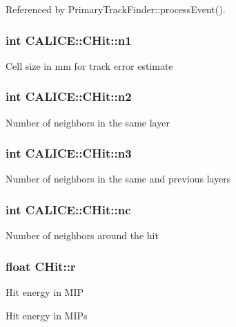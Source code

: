 Referenced by Primary\-Track\-Finder\-::process\-Event().

\subsubsection[{n1}]{\setlength{\rightskip}{0pt plus 5cm}int C\-A\-L\-I\-C\-E\-::\-C\-Hit\-::n1}\label{classCALICE_1_1CHit_ac76e3d9bbfa459b7a49cd30cc09639d3}
Cell size in mm for track error estimate 
\subsubsection[{n2}]{\setlength{\rightskip}{0pt plus 5cm}int C\-A\-L\-I\-C\-E\-::\-C\-Hit\-::n2}\label{classCALICE_1_1CHit_a7eb720820d3c5a6d73393f4f4dafd835}
Number of neighbors in the same layer 
\subsubsection[{n3}]{\setlength{\rightskip}{0pt plus 5cm}int C\-A\-L\-I\-C\-E\-::\-C\-Hit\-::n3}\label{classCALICE_1_1CHit_a2c9c0d94bba38ddb42a2e5f7f209c125}
Number of neighbors in the same and previous layers 
\subsubsection[{nc}]{\setlength{\rightskip}{0pt plus 5cm}int C\-A\-L\-I\-C\-E\-::\-C\-Hit\-::nc}\label{classCALICE_1_1CHit_aec2c8db262fd4081b45342f3825dc375}
Number of neighbors around the hit 
\subsubsection[{r}]{\setlength{\rightskip}{0pt plus 5cm}float C\-Hit\-::r}\label{classCALICE_1_1CHit_ac1bc0f62968053da2b6e42de30757397}
Hit energy in M\-I\-P

Hit energy in M\-I\-Ps 


